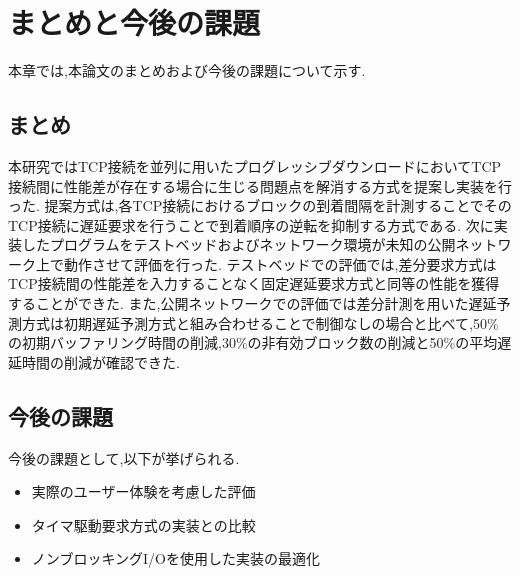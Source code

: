 \documentclass[a4j,12pt]{gradthesis_utf8}
\begin{document}
\newpage
 
\chapter{まとめと今後の課題}\label{matomekongo}
本章では,本論文のまとめおよび今後の課題について示す.
\section{まとめ}
本研究ではTCP接続を並列に用いたプログレッシブダウンロードにおいてTCP接続間に性能差が存在する場合に生じる問題点を解消する方式を提案し実装を行った.
提案方式は,各TCP接続におけるブロックの到着間隔を計測することでそのTCP接続に遅延要求を行うことで到着順序の逆転を抑制する方式である.
次に実装したプログラムをテストベッドおよびネットワーク環境が未知の公開ネットワーク上で動作させて評価を行った.
テストベッドでの評価では,差分要求方式はTCP接続間の性能差を入力することなく固定遅延要求方式と同等の性能を獲得することができた.
また,公開ネットワークでの評価では差分計測を用いた遅延予測方式は初期遅延予測方式と組み合わせることで制御なしの場合と比べて,50\%の初期バッファリング時間の削減,30\%の非有効ブロック数の削減と50\%の平均遅延時間の削減が確認できた.


\section{今後の課題}
\hspace*{0.5em}今後の課題として,以下が挙げられる.
\begin{itemize}
    \item 実際のユーザー体験を考慮した評価
    \item タイマ駆動要求方式の実装との比較
    \item ノンブロッキングI/Oを使用した実装の最適化
\end{itemize}
\end{document}
